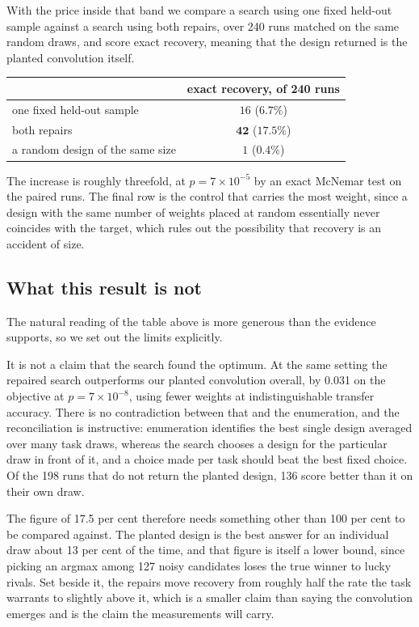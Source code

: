 \documentclass[11pt]{article}
\begin{document}
With the price inside that band we compare a search using one fixed held-out sample against a search
using both repairs, over 240 runs matched on the same random draws, and score exact recovery, meaning
that the design returned is the planted convolution itself.

\begin{center}
\begin{tabular}{lc}
\toprule
 & exact recovery, of 240 runs \\
\midrule
one fixed held-out sample        & $16$ \;($6.7\%$) \\
both repairs                     & $\mathbf{42}$ \;($17.5\%$) \\
a random design of the same size  & $1$ \;($0.4\%$) \\
\bottomrule
\end{tabular}
\end{center}

The increase is roughly threefold, at $p = 7 \times 10^{-5}$ by an exact McNemar test on the paired
runs. The final row is the control that carries the most weight, since a design with the same number of
weights placed at random essentially never coincides with the target, which rules out the possibility
that recovery is an accident of size.

\subsection{What this result is not}

The natural reading of the table above is more generous than the evidence supports, so we set out the
limits explicitly.

It is not a claim that the search found the optimum. At the same setting the repaired search outperforms
our planted convolution overall, by 0.031 on the objective at $p = 7 \times 10^{-8}$, using fewer
weights at indistinguishable transfer accuracy. There is no contradiction between that and the
enumeration, and the reconciliation is instructive: enumeration identifies the best single design
averaged over many task draws, whereas the search chooses a design for the particular draw in front of
it, and a choice made per task should beat the best fixed choice. Of the 198 runs that do not return the
planted design, 136 score better than it on their own draw.

The figure of 17.5 per cent therefore needs something other than 100 per cent to be compared against.
The planted design is the best answer for an individual draw about 13 per cent of the time, and that
figure is itself a lower bound, since picking an argmax among 127 noisy candidates loses the true winner
to lucky rivals. Set beside it, the repairs move recovery from roughly half the rate the task warrants
to slightly above it, which is a smaller claim than saying the convolution emerges and is the claim the
measurements will carry.
\end{document}
